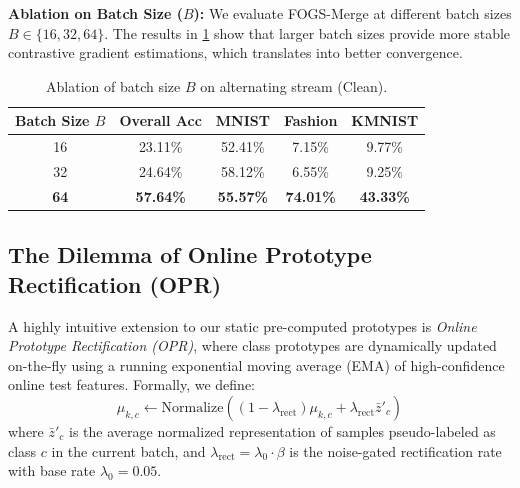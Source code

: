 \documentclass{article}
\theoremstyle{plain}
\theoremstyle{definition}
\theoremstyle{remark}
\begin{document}
\textbf{Ablation on Batch Size ($B$):} We evaluate FOGS-Merge at different batch sizes $B \in \{16, 32, 64\}$. The results in \cref{tab:ablation_bs} show that larger batch sizes provide more stable contrastive gradient estimations, which translates into better convergence.

\begin{table}[h]
\caption{Ablation of batch size $B$ on alternating stream (Clean).}
\label{tab:ablation_bs}
\vskip 0.1in
\begin{center}
\begin{small}
\begin{sc}
\setlength{\tabcolsep}{3pt}
\begin{tabular}{ccccc}
\toprule
Batch Size $B$ & Overall Acc & MNIST & Fashion & KMNIST \\
\midrule
16 & 23.11\% & 52.41\% & 7.15\% & 9.77\% \\
32 & 24.64\% & 58.12\% & 6.55\% & 9.25\% \\
\textbf{64} & \textbf{57.64\%} & \textbf{55.57\%} & \textbf{74.01\%} & \textbf{43.33\%} \\
\bottomrule
\end{tabular}
\end{sc}
\end{small}
\end{center}
\vskip -0.1in
\end{table}

\subsection{The Dilemma of Online Prototype Rectification (OPR)}
A highly intuitive extension to our static pre-computed prototypes is \textit{Online Prototype Rectification (OPR)}, where class prototypes are dynamically updated on-the-fly using a running exponential moving average (EMA) of high-confidence online test features. Formally, we define:
\begin{equation}
\mu_{k, c} \leftarrow \text{Normalize}\left( (1 - \lambda_{\text{rect}}) \mu_{k, c} + \lambda_{\text{rect}} \bar{z}'_c \right)
\end{equation}
where $\bar{z}'_c$ is the average normalized representation of samples pseudo-labeled as class $c$ in the current batch, and $\lambda_{\text{rect}} = \lambda_0 \cdot \beta$ is the noise-gated rectification rate with base rate $\lambda_0 = 0.05$.
\end{document}

